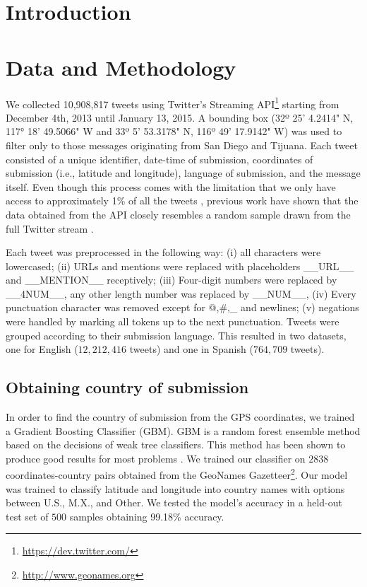\documentclass[11pt]{article}
\title{}
\author{}
\date{\today}
\begin{document}
\maketitle

\begin{abstract}

\end{abstract}

\section{Introduction}


\section{Data and Methodology}
We collected 10,908,817 tweets using Twitter's Streaming API\footnote{\url{https://dev.twitter.com/}} starting from December 4th, 2013 until January 13, 2015. A bounding box (32º 25' 4.2414" N, 117° 18' 49.5066" W and 33º 5' 53.3178" N, 116º 49' 17.9142" W) was used to filter only to those messages originating from San Diego and Tijuana. Each tweet consisted of a unique identifier, date-time of submission, coordinates of submission (i.e., latitude and longitude), language of submission, and the message itself. Even though this process comes with the limitation that we only have access to approximately 1\% of all the tweets \cite{Olteanu2015}, previous work have shown that the data obtained from the API closely resembles a random sample drawn from the full Twitter stream \cite{DBLP:journals/corr/MorstatterPLC13}.

Each tweet was preprocessed in the following way: (i) all characters were lowercased; (ii) URLs and mentions were replaced with placeholders \_\_URL\_\_ and \_\_MENTION\_\_ receptively; (iii) Four-digit numbers were replaced by \_\_4NUM\_\_, any other length number was replaced by \_\_NUM\_\_, (iv) Every punctuation character  was removed except for @,\#,\_ and newlines; (v) negations were handled by marking all tokens up to the next punctuation. Tweets were grouped according to their submission language. This resulted in two datasets, one for English ($12,212,416$ tweets) and one in Spanish ($764,709$ tweets). 

\subsection{Obtaining country of submission}
In order to find the country of submission from the GPS coordinates, we trained a Gradient Boosting Classifier (GBM). GBM is a random forest ensemble method based on the decisions of weak tree classifiers. This method has been shown to produce good results for most problems \cite{JMLR:v15:delgado14a}. We trained our classifier on $2838$ coordinates-country pairs obtained from the GeoNames Gazetteer\footnote{\url{http://www.geonames.org}}. Our model was trained to classify latitude and longitude into country names with options between U.S., M.X., and Other. We tested the model's accuracy in a held-out test set of $500$ samples obtaining 99.18\% accuracy.
\end{document}
